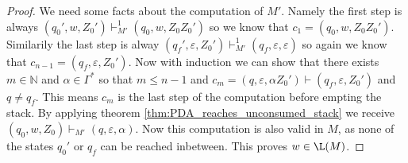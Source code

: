 \begin{proof}
  We need some facts about the computation of $M'$. Namely the first step is always
  $(q_0',w,Z_0')\vdash^1_{M'} (q_0,w,Z_0Z_0')$ so we know that $c_1=(q_0,w,Z_0Z_0')$.
  Similarily the last step is alway
  $(q_f',\varepsilon,Z_0')\vdash^1_{M'} (q_f,\varepsilon,\varepsilon)$
  so again we know that $c_{n-1}=(q_f,\varepsilon,Z_0')$. Now with induction we can
  show that there exists $m\in\mathbb{N}$ and $\alpha\in\Gamma^*$ so that $m\le n-1$ and
  $c_{m}=(q,\varepsilon,\alpha Z_0')\vdash(q_f,\varepsilon,Z_0')$ and $q\neq q_f$.
  This means $c_{m}$ is the last step of the computation before empting the stack.
  By applying theorem \ref{thm:PDA_reaches_unconsumed_stack} we receive
  $(q_0,w,Z_0)\vdash_{M'}(q,\varepsilon,\alpha)$. Now this computation is
  also valid in $M$, as none of the states $q_0'$ or $q_f$ can be reached inbetween.
  This proves $w\in\L(M)$.

\end{proof}

